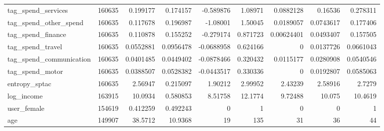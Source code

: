 \begin{tabular}{lrrrrrrrr}
 tag\_spend\_services      &  160635 &    0.199177   &    0.174157  &     -0.589876   &      1.08971  &    0.0882128  &   0.16536    &    0.278311  \\
 tag\_spend\_other\_spend   &  160635 &    0.117678   &    0.196987  &     -1.08001    &      1.50045  &    0.0189057  &   0.0743617  &    0.177406  \\
 tag\_spend\_finance       &  160635 &    0.110878   &    0.155252  &     -0.279174   &      0.871723 &    0.00624401 &   0.0493407  &    0.157505  \\
 tag\_spend\_travel        &  160635 &    0.0552881  &    0.0956478 &     -0.0688958  &      0.624166 &    0          &   0.0137726  &    0.0661043 \\
 tag\_spend\_communication &  160635 &    0.0401485  &    0.0449402 &     -0.0878466  &      0.320432 &    0.0115177  &   0.0280908  &    0.0540546 \\
 tag\_spend\_motor         &  160635 &    0.0388507  &    0.0528382 &     -0.0443517  &      0.330336 &    0          &   0.0192807  &    0.0585063 \\
 entropy\_sptac           &  160635 &    2.56947    &    0.215097  &      1.90212    &      2.99952  &    2.43239    &   2.58916    &    2.7279    \\
 log\_income              &  163915 &   10.0934     &    0.580853  &      8.51758    &     12.1774   &    9.72488    &  10.075      &   10.4619    \\
 user\_female             &  154619 &    0.412259   &    0.492243  &      0          &      1        &    0          &   0          &    1         \\
 age                     &  149907 &   38.5712     &   10.9368    &     19          &    135        &   31          &  36          &   44         \\
\bottomrule
\end{tabular}
